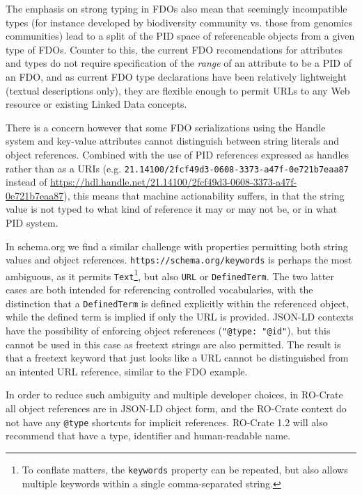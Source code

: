 The emphasis on strong typing in FDOs also mean that seemingly incompatible types (for instance developed by biodiversity community vs. those from genomics communities) lead to a split of the PID space of referencable objects from a given type of FDOs.  Counter to this, the current FDO recomendations for attributes and types \cite{fdo-ImplAttributesTypesProfiles} do not require specification of the \emph{range} of an attribute to be a PID of an FDO, and as current FDO type declarations have been relatively lightweight (textual descriptions only), they are flexible enough to permit URLs to any Web resource or existing Linked Data concepts.  

There is a concern however that some FDO serializations using the Handle system and key-value attributes cannot distinguish between string literals and object references.
Combined with the use of PID references expressed as handles rather than as a URIs (e.g. \texttt{21.14100/2fcf49d3-0608-3373-a47f-0e721b7eaa87} instead of \url{https://hdl.handle.net/21.14100/2fcf49d3-0608-3373-a47f-0e721b7eaa87}), this means that machine actionability suffers, in that the string value is not typed to what kind of reference it may or may not be, or in what PID system.

In schema.org we find a similar challenge with properties permitting both string values and object references. \texttt{https://schema.org/keywords} is perhaps the most ambiguous, as it permits \texttt{Text}\footnote{To conflate matters, the \texttt{keywords} property can be repeated, but also allows multiple keywords within a single comma-separated string.}, but also \texttt{URL} or \texttt{DefinedTerm}.
The two latter cases are both intended for referencing controlled vocabularies, with the distinction that a \texttt{DefinedTerm} is defined explicitly within the referenced object, while the defined term is implied if only the URL is provided.
JSON-LD contexts have the possibility of enforcing object references (\texttt{"@type: "@id"}), but this cannot be used in this case as freetext strings are also permitted.
The result is that a freetext keyword that just looks like a URL cannot be distinguished from an intented URL reference, similar to the FDO example.

In order to reduce such ambiguity and multiple developer choices, in RO-Crate all object references are in JSON-LD object form, and the RO-Crate context do not have any \texttt{@type} shortcuts for implicit references.
RO-Crate 1.2 will also recommend that  have a type, identifier and human-readable name. 


